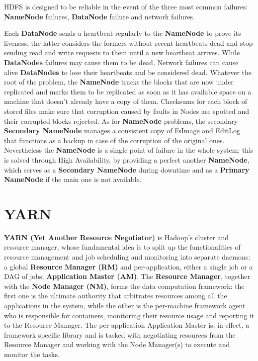 HDFS is designed to be reliable in the event of the three most common failures: \textbf{NameNode} failures, \textbf{DataNode} failure and network failures.

Each \textbf{DataNode} sends a heartbeat regularly to the \textbf{NameNode} to prove its liveness, the latter considers the formers without recent heartbeats dead and stop sending read and write requests to them until a new heartbeat arrives.\newline
While \textbf{DataNodes} failures may cause them to be dead, Network failures can cause alive \textbf{DataNodes} to lose their heartbeats and be considered dead.\newline
Whatever the root of the problem, the \textbf{NameNode} tracks the blocks that are now under replicated and marks them to be replicated as soon as it has available space on a machine that doesn't already have a copy of them.\newline
Checksums for each block of stored files make sure that corruption caused by faults in Nodes are spotted and their corrupted blocks rejected.\newline
As for \textbf{NameNode} problems, the secondary \textbf{Secondary NameNode} manages a consistent copy of FsImage and EditLog that functions as a backup in case of the corruption of the original ones. Nevertheless the \textbf{NameNode} is a single point of failure in the whole system; this is solved through High Availability, by providing a perfect another \textbf{NameNode}, which serves as a \textbf{Secondary NameNode} during downtime and as a \textbf{Primary NameNode} if the main one is not available.

\pagebreak
\section{YARN} \label{YARN}

\textbf{YARN (Yet Another Resource Negotiator)} is Hadoop's cluster and resource manager, whose fundamental idea is to split up the functionalities of resource management and job scheduling and monitoring into separate daemons: a global \textbf{Resource Manager (RM)} and per-application, either a single job or a DAG of jobs, \textbf{Application Master (AM)}.
\newline\newline
The \textbf{Resource Manager}, together with the \textbf{Node Manager (NM)}, forms the data computation framework: the first one is the ultimate authority that arbitrates resources among all the applications in the system, while the other is the per-machine framework agent who is responsible for containers, monitoring their resource usage and reporting it to the Resource Manager.
\newline\newline
The per-application Application Master is, in effect, a framework specific library and is tasked with negotiating resources from the Resource Manager and working with the Node Manager(s) to execute and monitor the tasks.

